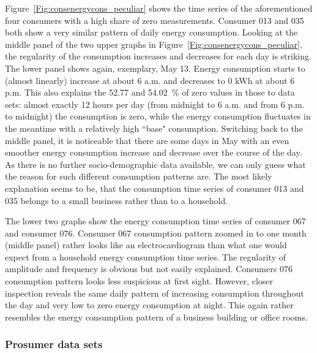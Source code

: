 Figure~\ref{Fig:consenergycons_peculiar} shows the time series of the aforementioned four consumers with a high share of zero measurements. Consumer 013 and 035 both show a very similar pattern of daily energy consumption. Looking at the middle panel of the two upper graphs in Figure~\ref{Fig:consenergycons_peculiar}, the regularity of the consumption increases and decreases for each day is striking. The lower panel shows again, exemplary, May 13. Energy consumption starts to (almost linearly) increase at about 6 a.m. and decreases to 0 kWh at about 6 p.m. This also explains the 52.77 and 54.02~\% of zero values in those to data sets: almost exactly 12 hours per day (from midnight to 6 a.m. and from 6 p.m. to midnight) the consumption is zero, while the energy consumption fluctuates in the meantime with a relatively high ``base" consumption. Switching back to the middle panel, it is noticeable that there are some days in May with an even smoother energy consumption increase and decrease over the course of the day. As there is no further socio-demographic data available, we can only guess what the reason for such different consumption patterns are. The most likely explanation seems to be, that the consumption time series of consumer 013 and 035 belongs to a small business rather than to a household.

The lower two graphs show the energy consumption time series of consumer 067 and consumer 076. Consumer 067 consumption pattern zoomed in to one month (middle panel) rather looks like an electrocardiogram than what one would expect from a household energy consumption time series. The regularity of amplitude and frequency is obvious but not easily explained. Consumers 076 consumption pattern looks less suspicious at first sight. However, closer inspection reveals the same daily pattern of increasing consumption throughout the day and very low to zero energy consumption at night. This again rather resembles the energy consumption pattern of a business building or office rooms.



\subsubsection{Prosumer data sets}


